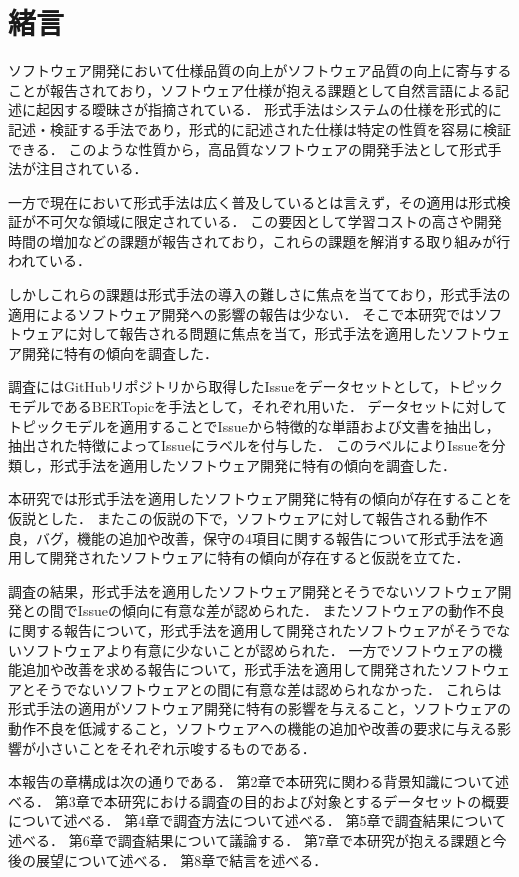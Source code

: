\documentclass[main]{subfiles}
\begin{document}
\chapter{緒言}

ソフトウェア開発において仕様品質の向上がソフトウェア品質の向上に寄与することが報告されており\cite{knauss:2009}，ソフトウェア仕様が抱える課題として自然言語による記述に起因する曖昧さが指摘されている\cite{kamsties:2005}．
形式手法はシステムの仕様を形式的に記述・検証する手法であり，形式的に記述された仕様は特定の性質を容易に検証できる．
このような性質から，高品質なソフトウェアの開発手法として形式手法が注目されている\cite{aoki:2018}．

一方で現在において形式手法は広く普及しているとは言えず，その適用は形式検証が不可欠な領域に限定されている．
この要因として学習コストの高さや開発時間の増加などの課題が報告されており\cite{reid:2020,kitamura:2021}，これらの課題を解消する取り組みが行われている\cite{huisman:2020,ohnishi:2020}．

しかしこれらの課題は形式手法の導入の難しさに焦点を当てており，形式手法の適用によるソフトウェア開発への影響の報告は少ない．
そこで本研究ではソフトウェアに対して報告される問題に焦点を当て，形式手法を適用したソフトウェア開発に特有の傾向を調査した．

調査にはGitHubリポジトリから取得したIssueをデータセットとして，トピックモデルであるBERTopic\cite{grootendorst:2022}を手法として，それぞれ用いた．
データセットに対してトピックモデルを適用することでIssueから特徴的な単語および文書を抽出し，抽出された特徴によってIssueにラベルを付与した．
このラベルによりIssueを分類し，形式手法を適用したソフトウェア開発に特有の傾向を調査した．

本研究では形式手法を適用したソフトウェア開発に特有の傾向が存在することを仮説とした．
またこの仮説の下で，ソフトウェアに対して報告される動作不良，バグ，機能の追加や改善，保守の4項目に関する報告について形式手法を適用して開発されたソフトウェアに特有の傾向が存在すると仮説を立てた．

調査の結果，形式手法を適用したソフトウェア開発とそうでないソフトウェア開発との間でIssueの傾向に有意な差が認められた．
またソフトウェアの動作不良に関する報告について，形式手法を適用して開発されたソフトウェアがそうでないソフトウェアより有意に少ないことが認められた．
一方でソフトウェアの機能追加や改善を求める報告について，形式手法を適用して開発されたソフトウェアとそうでないソフトウェアとの間に有意な差は認められなかった．
これらは形式手法の適用がソフトウェア開発に特有の影響を与えること，ソフトウェアの動作不良を低減すること，ソフトウェアへの機能の追加や改善の要求に与える影響が小さいことをそれぞれ示唆するものである．

本報告の章構成は次の通りである．
第2章で本研究に関わる背景知識について述べる．
第3章で本研究における調査の目的および対象とするデータセットの概要について述べる．
第4章で調査方法について述べる．
第5章で調査結果について述べる．
第6章で調査結果について議論する．
第7章で本研究が抱える課題と今後の展望について述べる．
第8章で結言を述べる．
\end{document}
